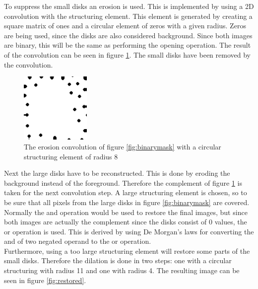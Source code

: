 \documentclass[a4paper]{article}
\begin{document}
\noindent To suppress the small disks an erosion is used. This is implemented by using a 2D convolution with the structuring element.
This element is generated by creating a square matrix of ones and a circular element of zeros with a given radius.
Zeros are being used, since the disks are also considered background.
Since both images are binary, this will be the same as performing the opening operation. The result of the 
convolution can be seen in figure \ref{fig:convolution}. The small disks have been removed by the convolution.

\begin{figure}[H]
  \centering
  \includegraphics[width=0.3\textwidth]{../lab4ex3/convolution.png} 
  \caption{The erosion convolution of figure \ref{fig:binarymask} with a circular structuring element of radius 8}
  \label{fig:convolution}
\end{figure}





\newpage

\noindent Next the large disks have to be reconstructed.
This is done by eroding the background instead of the foreground.
Therefore the complement of figure \ref{fig:convolution} is taken for the next convolution step.
A large structuring element is chosen, so to be sure that all pixels from the large disks in figure \ref{fig:binarymask} are covered.
Normally the and operation would be used to restore the final images, but since both images are actually the complement since
the disks consist of 0 values, the or operation is used.
This is derived by using De Morgan's laws for converting the and of two negated operand to the or operation.\\

\noindent Furthermore, using a too large structuring element will restore some parts of the small disks.
Therefore the dilation is done in two steps: one with a circular structuring with radius 11 and one with radius 4.
The resulting image can be seen in figure \ref{fig:restored}.
\end{document}
